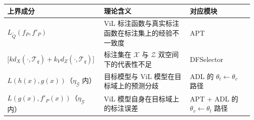 \begin{table}[!htbp]
    \vspace{0.5em}\centering\wuhao

    \vspace{0.5em}\centering{}
    \setlength{\tabcolsep}{5pt}
    \renewcommand{\arraystretch}{1.2}
    \begin{tabularx}{\textwidth}{@{}p{}p{}p{}@{}}
    \toprule
    上界成分 & 理论含义 & 对应模块 \\
    \midrule
    $L_{\tilde{Q}}(f_P,f'_P)$ & ViL 标注函数与真实标注函数在标注集上的经验不一致度 & APT \\
    $\big[kd_X(\cdot,\mathcal{T}_q)+k_Vd_Z(\cdot,\mathcal{T}_q)\big]$ & 标注集在 $\mathcal{X}$ 与 $\mathcal{Z}$ 双空间下的代表性不足 & DFSelector \\
    $L(h(x),g(x))$（$\eta_{\mathcal{G}}$ 内） & 目标模型与 ViL 模型在目标域上的预测分歧 & ADL 的 $\theta_t\leftarrow\theta_v$ 路径 \\
    $L(g(x),f'_P(x))$（$\eta_{\mathcal{G}}$ 内） & ViL 模型自身在目标域上的标注误差 & APT + ADL 的 $\theta_v\leftarrow\theta_t$ 路径 \\
    \bottomrule
    \end{tabularx}
\end{table}


